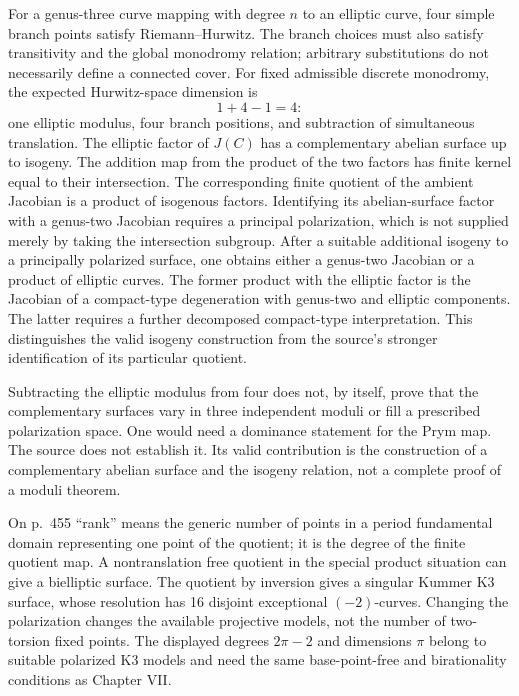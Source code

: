 For a genus-three curve mapping with degree \(n\) to an elliptic curve, four simple branch points satisfy Riemann--Hurwitz. The branch choices must also satisfy transitivity and the global monodromy relation; arbitrary substitutions do not necessarily define a connected cover. For fixed admissible discrete monodromy, the expected Hurwitz-space dimension is
\[
1+4-1=4:
\]
one elliptic modulus, four branch positions, and subtraction of simultaneous translation. The elliptic factor of \(J(C)\) has a complementary abelian surface up to isogeny. The addition map from the product of the two factors has finite kernel equal to their intersection. The corresponding finite quotient of the ambient Jacobian is a product of isogenous factors. Identifying its abelian-surface factor with a genus-two Jacobian requires a principal polarization, which is not supplied merely by taking the intersection subgroup. After a suitable additional isogeny to a principally polarized surface, one obtains either a genus-two Jacobian or a product of elliptic curves. The former product with the elliptic factor is the Jacobian of a compact-type degeneration with genus-two and elliptic components. The latter requires a further decomposed compact-type interpretation. This distinguishes the valid isogeny construction from the source's stronger identification of its particular quotient.

Subtracting the elliptic modulus from four does not, by itself, prove that the complementary surfaces vary in three independent moduli or fill a prescribed polarization space. One would need a dominance statement for the Prym map. The source does not establish it. Its valid contribution is the construction of a complementary abelian surface and the isogeny relation, not a complete proof of a moduli theorem.

On p.~455 ``rank'' means the generic number of points in a period fundamental domain representing one point of the quotient; it is the degree of the finite quotient map. A nontranslation free quotient in the special product situation can give a bielliptic surface. The quotient by inversion gives a singular Kummer K3 surface, whose resolution has 16 disjoint exceptional \((-2)\)-curves. Changing the polarization changes the available projective models, not the number of two-torsion fixed points. The displayed degrees \(2\pi-2\) and dimensions \(\pi\) belong to suitable polarized K3 models and need the same base-point-free and birationality conditions as Chapter VII.

